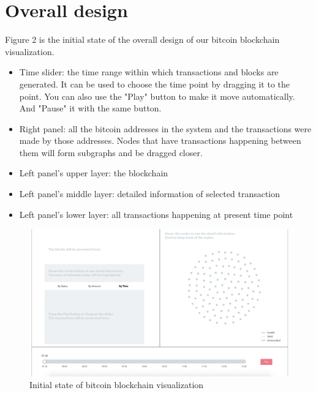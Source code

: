 \documentclass[journal, a4paper]{IEEEtran}
\begin{document}
\section{Overall design}
Figure 2 is the initial state of the overall design of our bitcoin blockchain visualization.
\begin{itemize}
    \item Time slider: the time range within which transactions and blocks are generated. It can be used to choose the time point by dragging it to the point. You can also use the "Play" button to make it move automatically. And "Pause" it with the same button.
    \item Right panel: all the bitcoin addresses in the system and the transactions were made by those addresses. Nodes that have transactions happening between them will form subgraphs and be dragged closer.
    \item Left panel's upper layer: the blockchain
    \item Left panel's middle layer: detailed information of selected transaction
    \item Left panel's lower layer: all transactions happening at present time point
\end{itemize}

\begin{figure}[!hbt]
		\begin{center}
		\includegraphics[width=\columnwidth]{overall_design_start.png}
		\caption{Initial state of bitcoin blockchain visualization}
		\label{fig:overall_design}
		\end{center}
	\end{figure}
\end{document}
